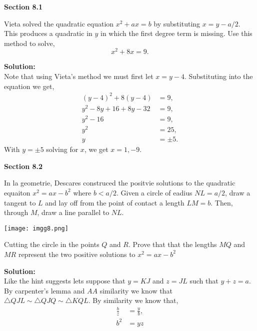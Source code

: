 \documentclass[12pt]{article}
\makeatletter
\theoremstyle{homework}
\newenvironment{exercise}[1]
{\def\@currentlabel{#1}\exercisecore}
{\endexercisecore}
\newcommand{\localhead}[1]{\par\smallskip\noindent\textbf{#1}\nobreak\\}%
\newcommand\solution{\localhead{Solution:}}
\makeatother
\begin{document}
\textbf{Section 8.1}

\begin{exercise}{12.a} Vieta solved the quadratic equation $x^2 + ax = b$ by substituting
$x = y - a/2$. This produces a quadratic in $y$ in which the first degree term is missing. Use this 
method to solve,
\begin{equation*}
  x^2+8x = 9.
\end{equation*} 
  \solution Note that using Vieta's method we must first let $x = y - 4$. Substituting into the equation we get, 
  \begin{align*}
    (y-4)^2 + 8(y-4) &= 9,\\
    y^2-8y+16 + 8y-32 &= 9,\\
    y^2 - 16 &= 9,\\
    y^2 &= 25,\\
    y &= \pm 5.
  \end{align*}
  With $y = \pm 5$ solving for $x$, we get $x = 1, -9$.
\end{exercise}
\vspace{.5in}



\textbf{Section 8.2}

\begin{exercise}{2} In la geometrie, Descares construced the positvie solutions to the quadratic 
  equaiton $x^2 = ax - b^2$ where $b< a/2$. Given a circle of eadius $NL = a/2$, 
  draw a tangent to $L$ and lay off from the point of contact a length $LM = b$. 
  Then, through $M$, draw a line parallel to $NL$. 
  \begin{center}
  \texttt{[image: imgg8.png]}
  \end{center}
  Cutting the circle in the points $Q$ and $R$. Prove that that the lengths 
  $MQ$ and $MR$ represent the two positive solutions to $x^2 = ax - b^2$\\

  \solution Like the hint suggests lets suppose that $y = KJ$ and $z = JL$
   such that $y + z = a$. By carpenter's lemma and $AA$ similarity we know that $\triangle QJL \sim \triangle QJQ \sim \triangle KQL$. By similarity we know that,
   \begin{align*}
     \frac{b}{z} &= \frac{y}{b},\\
     b^2 &= yz
   \end{align*}
   
\end{exercise}
\vspace{.5in}
\end{document}
